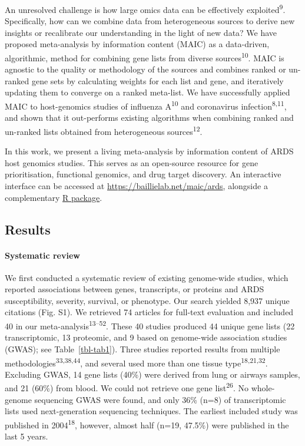 \documentclass[
  11,
  a4paper,
]{article}
\let\oldparagraph\paragraph
\renewcommand{\paragraph}[1]{\oldparagraph{#1}\mbox{}}
\begin{document}
An unresolved challenge is how large omics data can be effectively
exploited\textsuperscript{9}. Specifically, how can we combine data from
heterogeneous sources to derive new insights or recalibrate our
understanding in the light of new data? We have proposed meta-analysis
by information content (MAIC) as a data-driven, algorithmic, method for
combining gene lists from diverse sources\textsuperscript{10}. MAIC is
agnostic to the quality or methodology of the sources and combines
ranked or un-ranked gene sets by calculating weights for each list and
gene, and iteratively updating them to converge on a ranked meta-list.
We have successfully applied MAIC to host-genomics studies of influenza
A\textsuperscript{10} and coronavirus infection\textsuperscript{8,11},
and shown that it out-performs existing algorithms when combining ranked
and un-ranked lists obtained from heterogeneous
sources\textsuperscript{12}.

In this work, we present a living meta-analysis by information content
of ARDS host genomics studies. This serves as an open-source resource
for gene prioritisation, functional genomics, and drug target discovery.
An interactive interface can be accessed at
\url{https://baillielab.net/maic/ards}, alongside a complementary
\href{https://github.com/baillielab/ARDSMAICr}{R package}.

\newpage

\subsection{Results}\label{results}

\paragraph{Systematic review}\label{systematic-review}

We first conducted a systematic review of existing genome-wide studies,
which reported associations between genes, transcripts, or proteins and
ARDS susceptibility, severity, survival, or phenotype. Our search
yielded 8,937 unique citations (Fig. S1). We retrieved 74 articles for
full-text evaluation and included 40 in our
meta-analysis\textsuperscript{13--52}. These 40 studies produced 44
unique gene lists (22 transcriptomic, 13 proteomic, and 9 based on
genome-wide association studies (GWAS); see Table~\ref{tbl-tab1}). Three
studies reported results from multiple
methodologies\textsuperscript{33,38,44}, and several used more than one
tissue type\textsuperscript{18,21,32}. Excluding GWAS, 14 gene lists
(40\%) were derived from lung or airways samples, and 21 (60\%) from
blood. We could not retrieve one gene list\textsuperscript{26}. No
whole-genome sequencing GWAS were found, and only 36\% (n=8) of
transcriptomic lists used next-generation sequencing techniques. The
earliest included study was published in 2004\textsuperscript{18},
however, almost half (n=19, 47.5\%) were published in the last 5 years.
\end{document}
